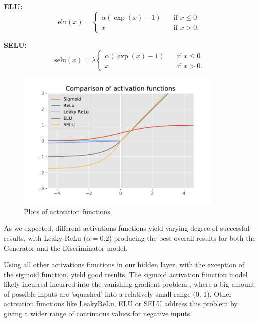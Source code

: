 \textbf{ELU:}
\begin{equation}
  \text{elu}(x) = 
  \begin{cases} 
      \alpha (\exp(x) - 1)      & \quad \text{if } x \leq  0 \\
      x       & \quad \text{if } x > 0 .
    \end{cases} 
\end{equation} 

\textbf{SELU:}
\begin{equation}
  \text{selu}(x) = \lambda
  \begin{cases} 
      \alpha (\exp(x) - 1)      & \quad \text{if } x \leq  0 \\
      x       & \quad \text{if } x > 0 .
    \end{cases} 
\end{equation} 

\begin{figure}[H]
\vskip -3mm
\begin{center}
\centerline{\includegraphics[width=10cm]{Figures/ActivationFns}}
\caption{Plots of activation functions}
\label{fig:activationfns}
\end{center}
\vskip -3mm
\end{figure}
As we expected, different activations functions yield varying degree of successful results, with Leaky ReLu ($\alpha=0.2$) producing the best overall results for both the Generator and the Discriminator model.

Using all other activations functions in our hidden layer, with the exception of the sigmoid function, yield good results.
The sigmoid activation function model likely incurred incurred into the vanishing gradient problem \citep{DBLP:journals/corr/abs-1211-5063}, where a big amount of possible inputs are 'squashed' into a relatively small range (0, 1). Other activation functions like LeakyReLu, ELU or SELU address this problem by giving a wider range of continuous values for negative inputs.

